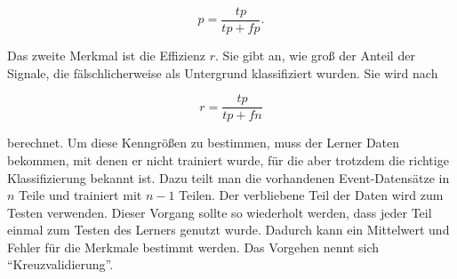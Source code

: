 \begin{equation}
	p=\frac{tp}{tp+fp}.
\end{equation}

Das zweite Merkmal ist die Effizienz $r$. Sie gibt an, wie groß der Anteil der Signale, die fälschlicherweise als Untergrund klassifiziert wurden. Sie wird nach

\begin{equation}
	r=\frac{tp}{tp+fn}
\end{equation}

berechnet. Um diese Kenngrößen zu bestimmen, muss der Lerner Daten bekommen, mit denen er nicht trainiert wurde, für die aber trotzdem die richtige Klassifizierung bekannt
ist. Dazu teilt man die vorhandenen Event-Datensätze in $n$ Teile und trainiert mit $n-1$ Teilen. Der verbliebene Teil der Daten wird zum Testen verwenden. Dieser Vorgang
sollte so wiederholt werden, dass jeder Teil einmal zum Testen des Lerners genutzt wurde. Dadurch kann ein Mittelwert und Fehler für die Merkmale bestimmt werden. Das Vorgehen nennt sich \enquote{Kreuzvalidierung}.